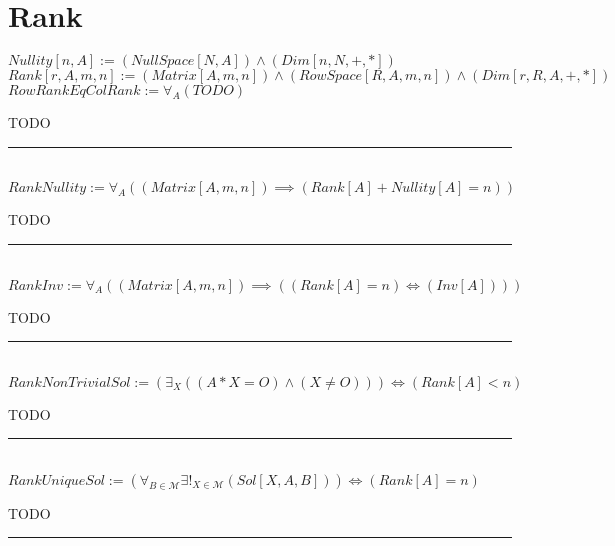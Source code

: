 \documentclass{book}
\newcommand{\abr}{:=}
\begin{document}
\section{Rank}
$Nullity[n, A] \abr (NullSpace[N, A]) \land (Dim[n, N, +, *])$ \\
$Rank[r, A, m, n] \abr (Matrix[A, m, n]) \land (RowSpace[R, A, m, n]) \land (Dim[r, R, A, +, *])$ \\

$RowRankEqColRank \abr \forall_{A}(TODO)$
\begin{enumerate}
  \lit TODO
\end{enumerate} \vspace{.75mm} \hrule \vspace{.75mm} \ \\ 

$RankNullity \abr \forall_{A}((Matrix[A, m, n]) \implies (Rank[A] + Nullity[A] = n))$
\begin{enumerate}
  \lit TODO
\end{enumerate} \vspace{.75mm} \hrule \vspace{.75mm} \ \\ 

$RankInv \abr \forall_{A}((Matrix[A, m, n]) \implies ((Rank[A] = n) \iff (Inv[A])))$
\begin{enumerate}
  \lit TODO
\end{enumerate} \vspace{.75mm} \hrule \vspace{.75mm} \ \\ 

$RankNonTrivialSol \abr (\exists_{X}((A * X = O) \land (X \neq O))) \iff (Rank[A] < n)$
\begin{enumerate}
  \lit TODO
\end{enumerate} \vspace{.75mm} \hrule \vspace{.75mm} \ \\ 

$RankUniqueSol \abr (\forall_{B \in \mathcal{M}} \exists!_{X \in \mathcal{M}}(Sol[X, A, B])) \iff (Rank[A] = n)$
\begin{enumerate}
  \lit TODO
\end{enumerate} \vspace{.75mm} \hrule \vspace{.75mm} \ \\ 
\end{document}
